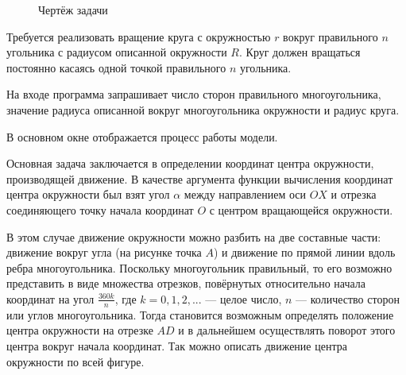 \begin{center}
\begin{figure}
\caption{Чертёж задачи}
\end{figure}
\end{center}

Требуется реализовать вращение круга с окружностью $r$ вокруг правильного $n$ угольника с радиусом описанной окружности $R$. Круг должен вращаться постоянно касаясь одной точкой правильного $n$ угольника.

На входе программа запрашивает число сторон правильного многоугольника, значение радиуса описанной вокруг многоугольника окружности и радиус круга.

В основном окне отображается процесс работы модели.

Основная задача заключается в определении координат центра окружности, производящей движение. В качестве аргумента функции вычисления координат центра окружности был взят угол $\alpha$ между направлением оси $OX$ и отрезка соединяющего точку начала координат $O$ с центром вращающейся окружности.

В этом случае движение окружности можно разбить на две составные части: движение вокруг угла (на рисунке точка $A$) и движение по прямой линии вдоль ребра многоугольника. Поскольку многоугольник правильный, то его возможно представить в виде множества отрезков, повёрнутых относительно начала координат на угол $\frac {360k} {n}$, где $k = 0, 1, 2, ...$ --- целое число, $n$ --- количество сторон или углов многоугольника. Тогда становится возможным определять положение центра окружности на отрезке $AD$ и в дальнейшем осуществлять поворот этого центра вокруг начала координат. Так можно описать движение центра окружности по всей фигуре.

